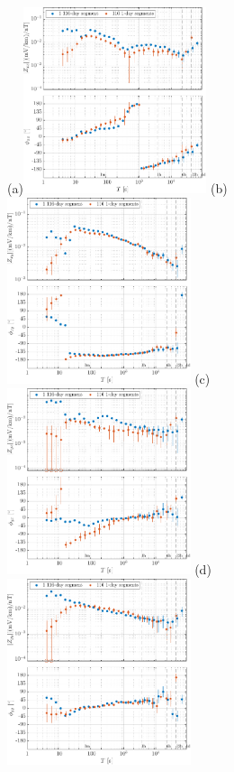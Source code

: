 \documentclass[draft,linenumbers]{agujournal2018}
\begin{document}
\begin{figure}[h!]
  \vspace{-2em}
  \subfigure(a){\includegraphics[width=0.48\textwidth]{figures/zplot-magnitude_phase-Middelpos-tf1;Middelpos-tf3-Z_xx.pdf}} 
  \subfigure(b){\includegraphics[width=0.48\textwidth]{figures/zplot-magnitude_phase-Middelpos-tf1;Middelpos-tf3-Z_xy.pdf}} 
  \subfigure(c){\includegraphics[width=0.48\textwidth]{figures/zplot-magnitude_phase-Middelpos-tf1;Middelpos-tf3-Z_yx.pdf}} 
  \subfigure(d){\includegraphics[width=0.48\textwidth]{figures/zplot-magnitude_phase-Middelpos-tf1;Middelpos-tf3-Z_yy.pdf}} 


\end{figure}
\end{document}
